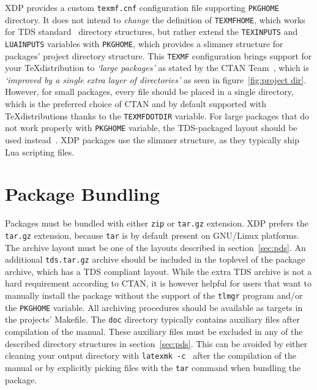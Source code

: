 \documentclass{xdpdoc}
\begin{document}
    XDP provides a custom \texttt{texmf.cnf} configuration file supporting \texttt{PKGHOME} directory.
    It does not intend to \textit{change} the definition of \texttt{TEXMFHOME}, which works for TDS standard~\cite{tds} directory structures, but rather extend the \texttt{TEXINPUTS} and \texttt{LUAINPUTS} variables with \texttt{PKGHOME}, which provides a slimmer structure for packages' project directory structure.
    This \texttt{TEXMF} configuration brings support for your \TeX distribution to \textit{`large packages'} as stated by the CTAN Team~\cite{ctan:help:upload}, which is \textit{`improved by a single extra layer of directories'} as seen in figure~\ref{fig:project dir}.
    However, for small packages, every file should be placed in a single directory, which is the preferred choice of CTAN and by default supported with \TeX distributions thanks to the \texttt{TEXMFDOTDIR} variable.
    For large packages that do not work properly with \texttt{PKGHOME} variable, the TDS-packaged layout should be used instead~\cite{ctan:help:tds}.
    XDP packages use the slimmer structure, as they typically ship Lua scripting files.


    \section{Package Bundling}\label{sec:bundling}

    Packages must be bundled with either \texttt{zip} or \texttt{tar.gz} extension.
    XDP prefers the \texttt{tar.gz} extension, because \texttt{tar} is by default present on GNU/Linux platforms.
    The archive layout must be one of the layouts described in section~\ref{sec:pds}.
    An additional \texttt{tds.tar.gz} archive should be included in the toplevel of the package archive, which has a TDS compliant layout.
    While the extra TDS archive is not a hard requirement according to CTAN, it is however helpful for users that want to manually install the package without the support of the \texttt{tlmgr} program and/or the \texttt{PKGHOME} variable.
    All archiving procedures should be available as targets in the projects' Makefile.
    The \texttt{doc} directory typically contains auxiliary files after compilation of the manual.
    These auxiliary files must be excluded in any of the described directory structures in section~\ref{sec:pds}.
    This can be avoided by either cleaning your output directory with \texttt{latexmk -c } after the compilation of the manual or by explicitly picking files with the \texttt{tar} command when bundling the package.
\end{document}
